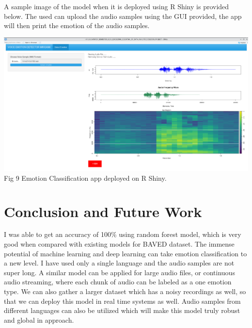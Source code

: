 \documentclass[11pt,a4paper]{article}
\begin{document}
A sample image of the model when it is deployed using R Shiny is provided below. The used can upload the audio samples using the GUI provided, the app will then print the emotion of the audio samples.
    \begin{center}
	
	\includegraphics[scale=0.15]{deployment_CSE3506_pic.png} \\ 
	Fig 9 Emotion Classification app deployed on R Shiny.\\
	
\end{center} 

\section{Conclusion and Future Work}
I was able to get an accuracy of 100\% using random forest model, which is very good when compared with existing models for BAVED dataset. The immense potential of machine learning and deep learning can take emotion classification to a new level. I have used only a single language and the audio samples are not super long. A similar model can be applied for large audio files, or continuous audio streaming, where each chunk of audio can be labeled as a one emotion type. We can also gather a larger dataset which has a noisy recordings as well, so that we can deploy this model in real time systems as well. Audio samples from different languages can also be utilized which will make this model truly robust and global in approach.
	
	
	
	
	
	
\end{document}
